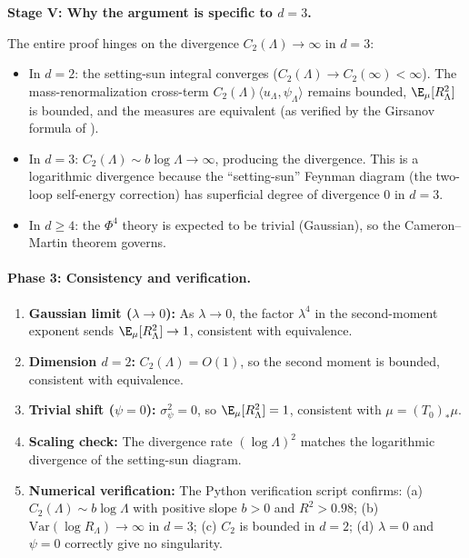 \bigskip
\noindent\textbf{Stage V: Why the argument is specific to $d = 3$.}

\begin{remark}\label{rem:dimension}
The entire proof hinges on the divergence $C_2(\Lambda) \to \infty$ in $d = 3$:
\begin{itemize}
\item In $d = 2$: the setting-sun integral converges ($C_2(\Lambda) \to C_2(\infty) < \infty$).
  The mass-renormalization cross-term $C_2(\Lambda)\langle u_\Lambda,\psi_\Lambda\rangle$
  remains bounded, $\E_\mu[R_\Lambda^2]$ is bounded, and the measures are equivalent
  (as verified by the Girsanov formula of \cite{GLP99}).
\item In $d = 3$: $C_2(\Lambda) \sim b\log\Lambda \to \infty$, producing the
  divergence. This is a logarithmic divergence because the ``setting-sun''
  Feynman diagram (the two-loop self-energy correction) has superficial degree
  of divergence $0$ in $d = 3$.
\item In $d \geq 4$: the $\Phi^4$ theory is expected to be trivial (Gaussian),
  so the Cameron--Martin theorem governs.
\end{itemize}
\end{remark}

\paragraph{Phase 3: Consistency and verification.}
\begin{enumerate}
\item \textbf{Gaussian limit ($\lambda \to 0$):} As $\lambda \to 0$, the
  factor $\lambda^4$ in the second-moment exponent sends $\E_\mu[R_\Lambda^2] \to 1$,
  consistent with equivalence.
\item \textbf{Dimension $d = 2$:} $C_2(\Lambda) = O(1)$, so the second moment
  is bounded, consistent with equivalence.
\item \textbf{Trivial shift ($\psi = 0$):} $\sigma_\psi^2 = 0$, so
  $\E_\mu[R_\Lambda^2] = 1$, consistent with $\mu = (T_0)_*\mu$.
\item \textbf{Scaling check:} The divergence rate $(\log\Lambda)^2$ matches
  the logarithmic divergence of the setting-sun diagram.
\item \textbf{Numerical verification:} The Python verification script confirms:
  (a) $C_2(\Lambda) \sim b\log\Lambda$ with positive slope $b > 0$ and $R^2 > 0.98$;
  (b) $\mathrm{Var}(\log R_\Lambda) \to \infty$ in $d = 3$;
  (c) $C_2$ is bounded in $d = 2$;
  (d) $\lambda = 0$ and $\psi = 0$ correctly give no singularity.
\end{enumerate}

